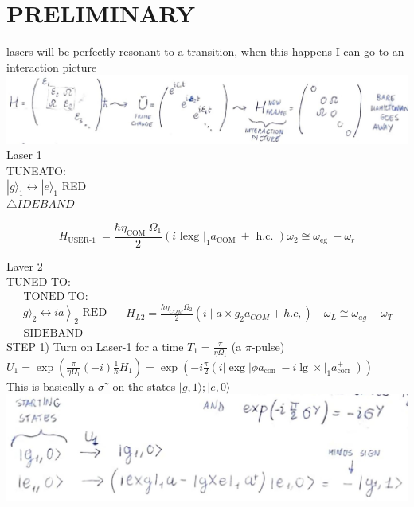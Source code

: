 \documentclass[10pt]{article}
\begin{document}
\section*{PRELIMINARY}
lasers will be perfectly resonant to a transition, when this happens I can go to an interaction picture\\
\includegraphics[max width=\textwidth, center]{2025_10_16_f28de32ab20bd0ac9bbfg-5(2)}\\
Laser 1\\
TUNEATO:\\
$|g\rangle_{1} \leftrightarrow|e\rangle_{1}$ RED\\
$\triangle I D E B A N D$

$$
H_{\text {USER-1 }}=\frac{\hbar \eta_{\text {COM }} \Omega_{1}}{2}\left(i \text { lexg }\left.\right|_{1} a_{\text {COM }}+\text { h.c. }\right) \omega_{2} \cong \omega_{\text {eg }}-\omega_{r}
$$

Laver 2\\
TUNED TO:\\
$\begin{aligned} & \text { TONED TO: } \\ & \left.|g\rangle_{2} \leftrightarrow i a\right\rangle_{2} \text { RED } \\ & \text { SIDEBAND }\end{aligned} \quad H_{L 2}=\frac{\hbar \eta_{C O M} \Omega_{2}}{2}\left(i \mid a \times g_{2} a_{C O M}+h . c,\right) \quad \omega_{L} \cong \omega_{a g}-\omega_{T}$\\
STEP 1) Turn on Laser-1 for a time $T_{1}=\frac{\pi}{\eta \Omega_{1}}$ (a $\pi$-pulse)\\
$U_{1}=\exp \left(\frac{\pi}{\eta \Omega_{1}}(-i) \frac{1}{\hbar} H_{1}\right)=\exp \left(-i \frac{\pi}{2}\left(i|\operatorname{exg}| \phi a_{\text {con }}-i \lg \times\left.\right|_{1} a_{\text {corr }}^{+}\right)\right)$\\
This is basically a $\sigma^{\gamma}$ on the states $|g, 1\rangle ;|e, 0\rangle$\\
\includegraphics[max width=\textwidth, center]{2025_10_16_f28de32ab20bd0ac9bbfg-5(3)}
\end{document}
